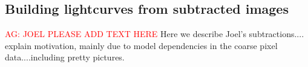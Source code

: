 \documentclass[a4paper,fleqn,usenatbib]{mnras}
\newcommand{\ag}[1]{\textcolor{red}{AG: #1}}
\begin{document}

\subsection{Building lightcurves from subtracted images}
\ag{JOEL PLEASE ADD TEXT HERE}
Here we describe Joel's subtractions.... explain motivation, mainly due to model 
dependencies in the coarse pixel data....including pretty pictures.
\end{document}

